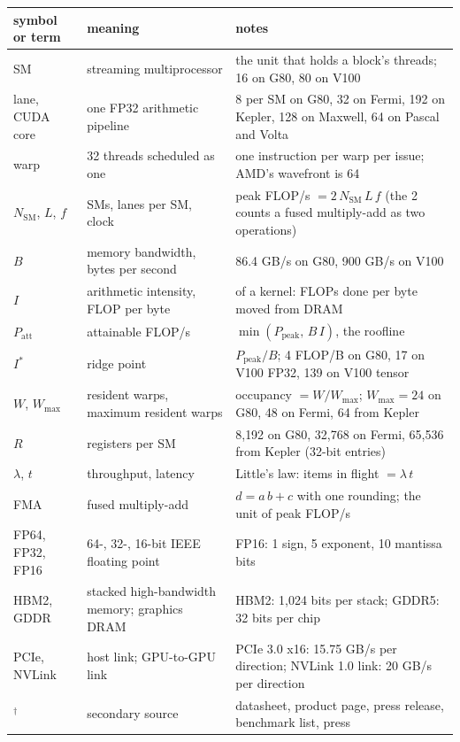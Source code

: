 \documentclass[11pt,letterpaper]{article}
\begin{document}
\begin{center}\footnotesize\setlength{\tabcolsep}{4pt}
\begin{tabular}{@{}lp{4.8cm}p{6.4cm}@{}}
\toprule
symbol or term & meaning & notes\\
\midrule
SM & streaming multiprocessor & the unit that holds a block's threads; 16 on G80, 80 on V100\\
lane, CUDA core & one FP32 arithmetic pipeline & 8 per SM on G80, 32 on Fermi, 192 on Kepler, 128 on Maxwell, 64 on Pascal and Volta\\
warp & 32 threads scheduled as one & one instruction per warp per issue; AMD's wavefront is 64\\
$N_{\mathrm{SM}}$, $L$, $f$ & SMs, lanes per SM, clock & peak FLOP/s $= 2\,N_{\mathrm{SM}}\,L\,f$ (the 2 counts a fused multiply-add as two operations)\\
$B$ & memory bandwidth, bytes per second & 86.4 GB/s on G80, 900 GB/s on V100\\
$I$ & arithmetic intensity, FLOP per byte & of a kernel: FLOPs done per byte moved from DRAM\\
$P_{\text{att}}$ & attainable FLOP/s & $\min(P_{\text{peak}},\,B\,I)$, the roofline\\
$I^\ast$ & ridge point & $P_{\text{peak}}/B$; 4 FLOP/B on G80, 17 on V100 FP32, 139 on V100 tensor\\
$W$, $W_{\max}$ & resident warps, maximum resident warps & occupancy $= W/W_{\max}$; $W_{\max}=24$ on G80, 48 on Fermi, 64 from Kepler\\
$R$ & registers per SM & 8{,}192 on G80, 32{,}768 on Fermi, 65{,}536 from Kepler (32-bit entries)\\
$\lambda$, $t$ & throughput, latency & Little's law: items in flight $=\lambda\,t$\\
FMA & fused multiply-add & $d = a\,b + c$ with one rounding; the unit of peak FLOP/s\\
FP64, FP32, FP16 & 64-, 32-, 16-bit IEEE floating point & FP16: 1 sign, 5 exponent, 10 mantissa bits\\
HBM2, GDDR & stacked high-bandwidth memory; graphics DRAM & HBM2: 1{,}024 bits per stack; GDDR5: 32 bits per chip\\
PCIe, NVLink & host link; GPU-to-GPU link & PCIe 3.0 x16: 15.75 GB/s per direction; NVLink 1.0 link: 20 GB/s per direction\\
$^\dagger$ & secondary source & datasheet, product page, press release, benchmark list, press\\
\bottomrule
\end{tabular}
\end{center}
\end{document}
